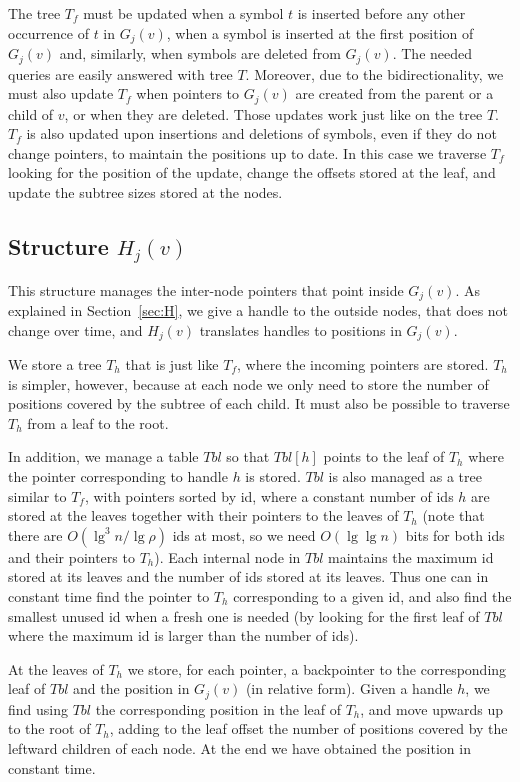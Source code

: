 \documentclass[11pt]{article}
\begin{document}
The tree $T_f$ must be updated when a symbol $t$ is inserted before any other 
occurrence of $t$ in $G_j(v)$, when a symbol is inserted at the first position 
of $G_j(v)$ and, similarly, when symbols are deleted from $G_j(v)$. The needed
queries are easily answered with tree $T$. Moreover, due to the 
bidirectionality, we must also update $T_f$ when pointers to $G_j(v)$ are 
created from the parent or a child of $v$, or when they are deleted. 
Those updates work just like on the tree
$T$. $T_f$ is also updated upon insertions and deletions of symbols, even 
if they do not change pointers, to maintain the positions up to date. In this
case we traverse $T_f$ looking for the position of the update, change the 
offsets stored at the leaf, and update the subtree sizes stored at the nodes. 

\subsection{Structure $H_j(v)$} 

This structure manages the inter-node pointers that point inside $G_j(v)$.
As explained in Section~\ref{sec:H}, we give a handle to the outside nodes, 
that does
not change over time, and $H_j(v)$ translates handles to positions in $G_j(v)$.

We store a tree $T_h$ that is just like $T_f$, where the incoming pointers 
are stored. $T_h$ is simpler, however, because at each node we only need to
store the number of positions covered by the subtree of each child. It must
also be possible to traverse $T_h$ from a leaf to the root. 

In addition, we manage a table $Tbl$ so that $Tbl[h]$ points to the leaf of 
$T_h$ where the pointer corresponding to handle $h$ is stored. $Tbl$ is also
managed as a tree similar to $T_f$, with pointers sorted by id,
where a constant number of ids $h$ are stored
at the leaves together with their pointers to the leaves of $T_h$ (note that 
there are $O(\lg^3 n /\lg\rho)$ ids at most, so we need $O(\lg\lg n)$ 
bits for both ids and their pointers to $T_h$). Each internal node in $Tbl$ 
maintains the maximum id stored at its leaves and the number of ids stored at 
its leaves. Thus one can in constant time find the pointer to $T_h$ 
corresponding to a given id, and also find the smallest unused id when a
fresh one is needed (by looking for the first leaf of $Tbl$ where the maximum
id is larger than the number of ids).

At the leaves of $T_h$ we store, for each pointer, a backpointer 
to the corresponding leaf of $Tbl$ and the position in $G_j(v)$ (in relative 
form). Given a handle $h$, we find using $Tbl$ the corresponding position in the
leaf of $T_h$, and move upwards up to the root of $T_h$, adding to the leaf 
offset the 
number of positions covered by the leftward children of each node. At the end 
we have obtained the position in constant time.
\end{document}
